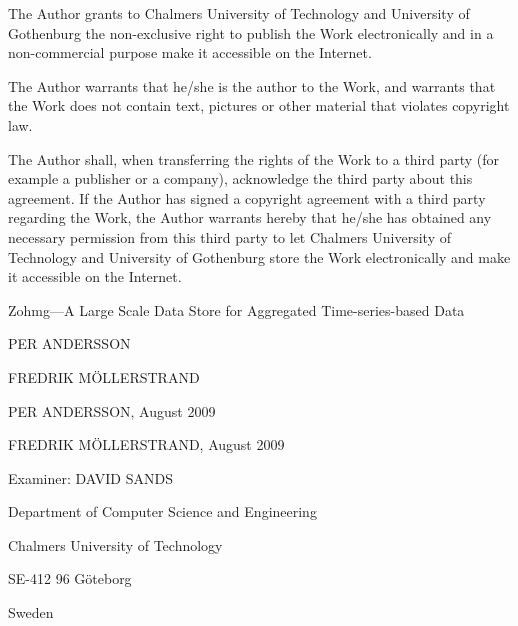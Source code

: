 \pagebreak


\setcounter{page}{1}

\noindent The Author grants to Chalmers University of Technology and University
of Gothenburg the non-exclusive right to publish the Work electronically and in
a non-commercial purpose make it accessible on the Internet.

\vspace{12pt}

\noindent The Author warrants that he/she is the author to the Work, and
warrants that the Work does not contain text, pictures or other material that
violates copyright law.

\vspace{12pt}

\noindent The Author shall, when transferring the rights of the Work to a third
party (for example a publisher or a company), acknowledge the third party about
this agreement. If the Author has signed a copyright agreement with a third
party regarding the Work, the Author warrants hereby that he/she has obtained
any necessary permission from this third party to let Chalmers University of
Technology and University of Gothenburg store the Work electronically and make
it accessible on the Internet.

\vspace{64pt}

\noindent Zohmg---A Large Scale Data Store for Aggregated Time-series-based
Data


\vspace{24pt}


\noindent PER ANDERSSON

\noindent FREDRIK M{\"O}LLERSTRAND


\vspace{12pt}


\noindent {\copyright} PER ANDERSSON, August 2009

\noindent {\copyright} FREDRIK M{\"O}LLERSTRAND, August 2009


\vspace{12pt}


\noindent Examiner: DAVID SANDS


\vspace{72pt}


\noindent Department of Computer Science and Engineering

\noindent Chalmers University of Technology

\noindent SE-412 96 G{\"o}teborg

\noindent Sweden

